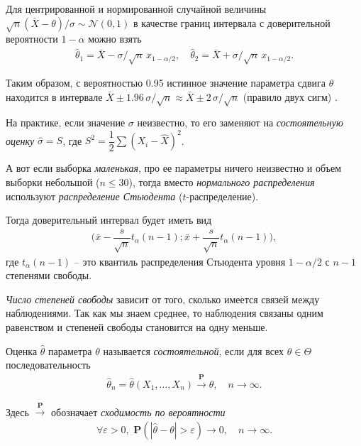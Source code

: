 \documentclass[%
	11pt,
	a4paper,
	utf8,
		]{article}
\begin{document}
Для центрированной и нормированной случайной величины $ \sqrt{n}(\bar{X} - \theta)/\sigma \sim \mathcal{N}(0,1) $ в качестве границ интервала с доверительной вероятности $ 1 - \alpha $ можно взять
\begin{align*}
	\hat{\theta}_1 = \bar{X} - \sigma/\sqrt{n} \, x_{1 - \alpha/2}, \quad \hat{\theta}_2 = \bar{X} + \sigma/\sqrt{n} \, x_{1 - \alpha/2}.
\end{align*}

Таким образом, с вероятностью 0.95 истинное значение параметра сдвига $ \theta $ находится в интервале $ \bar{X} \pm 1.96\, \sigma/\sqrt{n} \approx \bar{X} \pm 2\, \sigma/\sqrt{n} $ (правило двух сигм) \cite[147]{lagutin:2009}.

На практике, если значение $ \sigma $ неизвестно, то его заменяют на \emph{состоятельную оценку} $ \hat{\sigma} = S $, где $ S^2 = \dfrac{1}{2}\sum (X_i - \hat{X})^2 $.

А вот если выборка \emph{маленькая}, про ее параметры ничего неизвестно и объем выборки небольшой ($ n \leqslant 30 $), тогда вместо \emph{нормального распределения} используют \emph{распределение Стьюдента} ($ t $-распределение).

Тогда доверительный интервал будет иметь вид
\begin{align*}
	\Big( \bar{x} - \dfrac{s}{\sqrt{n}} t_{\alpha}(n - 1); \bar{x} + \dfrac{s}{\sqrt{n}} t_{\alpha}(n - 1) \Big),
\end{align*}
где $ t_{\alpha}(n-1) $ -- это квантиль распределения Стьюдента уровня $ 1 - \alpha / 2 $ с $ n - 1 $ степенями свободы.


\emph{Число степеней свободы} зависит от того, сколько имеется связей между наблюдениями. Так как мы знаем среднее, то наблюдения связаны одним равенством и степеней свободы становится на одну меньше.

Оценка $ \hat{\theta} $ параметра $ \theta $ называется \emph{состоятельной}, если для всех $ \theta \in \Theta $ последовательность
\begin{align*}
	\hat{\theta}_n = \hat{\theta}(X_1, \dots, X_n) \xrightarrow{\mathbf{P}} \theta, \quad n \to \infty.
\end{align*}

Здесь $ \xrightarrow{\mathbf{P}} $ обозначает \emph{сходимость по вероятности}
\begin{align*}
	\forall \varepsilon > 0, \,\, \mathbf{P}( | \hat{\theta} - \theta | > \varepsilon ) \to 0, \quad n \to \infty.
\end{align*}
\end{document}
